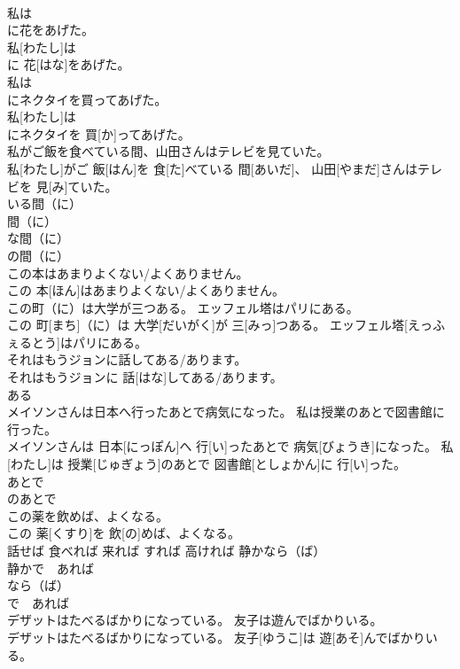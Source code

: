 \documentclass[8pt]{extreport}
\begin{document}
\begin{CJK}{UTF8}{min}
\\	私は
\\	に花をあげた。	
\\	私[わたし]は 
\\	に 花[はな]をあげた。	
\\	私は
\\	にネクタイを買ってあげた。	
\\	私[わたし]は 
\\	にネクタイを 買[か]ってあげた。	
\\	私がご飯を食べている間、山田さんはテレビを見ていた。	
\\	私[わたし]がご 飯[はん]を 食[た]べている 間[あいだ]、 山田[やまだ]さんはテレビを 見[み]ていた。	
\\	いる間（に） 
\\	間（に） 
\\	な間（に） 
\\	の間（に）	
\\	この本はあまりよくない/よくありません。	
\\	この 本[ほん]はあまりよくない/よくありません。	
\\	この町（に）は大学が三つある。 エッフェル塔はパリにある。	
\\	この 町[まち]（に）は 大学[だいがく]が 三[みっ]つある。 エッフェル塔[えっふぇるとう]はパリにある。	
\\	それはもうジョンに話してある/あります。	
\\	それはもうジョンに 話[はな]してある/あります。	
\\	ある	
\\	メイソンさんは日本へ行ったあとで病気になった。 私は授業のあとで図書館に行った。	
\\	メイソンさんは 日本[にっぽん]へ 行[い]ったあとで 病気[びょうき]になった。 私[わたし]は 授業[じゅぎょう]のあとで 図書館[としょかん]に 行[い]った。	
\\	あとで 
\\	のあとで	
\\	この薬を飲めば、よくなる。	
\\	この 薬[くすり]を 飲[の]めば、よくなる。	
\\	話せば 食べれば 来れば すれば 高ければ 静かなら（ば）　
\\	静かで　あれば 
\\	なら（ば）　
\\	で　あれば	
\\	デザットはたべるばかりになっている。 友子は遊んでばかりいる。	
\\	デザットはたべるばかりになっている。 友子[ゆうこ]は 遊[あそ]んでばかりいる。	

\end{CJK}
\end{document}
